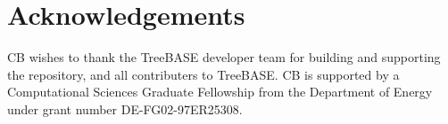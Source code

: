 \documentclass{elsarticle}
\begin{document}
 \section{Acknowledgements}
 CB wishes to thank the TreeBASE developer team for building and supporting the repository, and all contributers to TreeBASE.
 CB is supported by a Computational Sciences Graduate Fellowship from the Department of Energy under grant number DE-FG02-97ER25308.   
 \section*{ }%
% 
  
\end{document}
